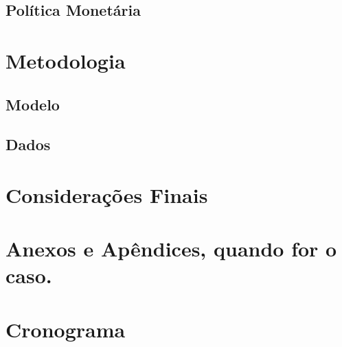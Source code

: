 \documentclass[12pt,oneside,a4paper,chapter=TITLE,english,brazil,sumario=abnt-6027-2012]{abntex2}
\begin{document}
\section{Política Monetária}

\chapter{Metodologia}

\section{Modelo}

\section{Dados}

\chapter{Considerações Finais}








\apendices

\chapter{Anexos e Apêndices, quando for o caso.}

\chapter{Cronograma}
\end{document}
